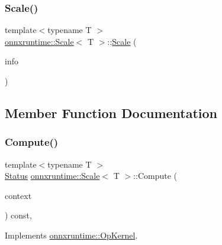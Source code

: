 \subsubsection{\texorpdfstring{Scale()}{Scale()}}
{\footnotesize\ttfamily template$<$typename T $>$ \\
\mbox{\hyperlink{classonnxruntime_1_1Scale}{onnxruntime\+::\+Scale}}$<$ T $>$\+::\mbox{\hyperlink{classonnxruntime_1_1Scale}{Scale}} (\begin{DoxyParamCaption}\item[{const \mbox{\hyperlink{classonnxruntime_1_1OpKernelInfo}{Op\+Kernel\+Info}} \&}]{info }\end{DoxyParamCaption})\hspace{0.3cm}{\ttfamily [inline]}}



\subsection{Member Function Documentation}
\mbox{\label{classonnxruntime_1_1Scale_ac056b024b0352a740117ddeb321c8265}} 
\subsubsection{\texorpdfstring{Compute()}{Compute()}\hspace{0.1cm}{\footnotesize\ttfamily [1/2]}}
{\footnotesize\ttfamily template$<$typename T $>$ \\
\mbox{\hyperlink{classonnxruntime_1_1common_1_1Status}{Status}} \mbox{\hyperlink{classonnxruntime_1_1Scale}{onnxruntime\+::\+Scale}}$<$ T $>$\+::Compute (\begin{DoxyParamCaption}\item[{\mbox{\hyperlink{classonnxruntime_1_1OpKernelContext}{Op\+Kernel\+Context}} $\ast$}]{context }\end{DoxyParamCaption}) const\hspace{0.3cm}{\ttfamily [override]}, {\ttfamily [virtual]}}



Implements \mbox{\hyperlink{classonnxruntime_1_1OpKernel_a9eca8656a78b1b3ab9d3351a12798650}{onnxruntime\+::\+Op\+Kernel}}.

\mbox{\label{classonnxruntime_1_1Scale_a4ff83bb8c20768c848df0c457f190f58}} 

